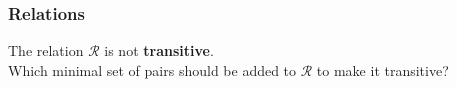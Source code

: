 \documentclass{beamer}
\begin{document}
\begin{frame}
\frametitle{Relations}
\LARGE
\vspace{-2cm}
The relation $\mathcal{R}$ is not \textbf{transitive}. \\ \bigskip Which minimal set of pairs should be added to  $\mathcal{R}$  to make it transitive?
\end{frame}

\begin{frame}
\end{frame}

\end{document}

